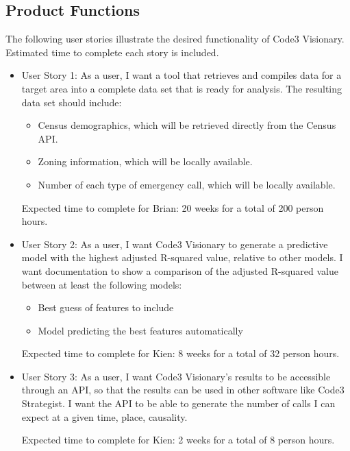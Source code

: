 \documentclass[onecolumn, draftclsnofoot,10pt, compsoc]{IEEEtran}
\begin{document}
    \subsection{Product Functions}
    The following user stories illustrate the desired functionality of Code3 Visionary. Estimated time to complete each story is included.
    \begin{itemize}
        \item{User Story 1:} As a user, I want a tool that retrieves and compiles data for a target area into a complete data set that is ready for analysis. The resulting data set should include:
        \begin{itemize}
            \item Census demographics, which will be retrieved directly from the Census API.
            \item Zoning information, which will be locally available.
            \item Number of each type of emergency call, which will be locally available.
        \end{itemize}
        Expected time to complete for Brian: 20 weeks for a total of 200 person hours.
        \item{User Story 2:} As a user, I want Code3 Visionary to generate a predictive model with the highest adjusted R-squared value, relative to other models. I want documentation to show a comparison of the adjusted R-squared value between at least the following models:
        \begin{itemize}
            \item Best guess of features to include
            \item Model predicting the best features automatically
        \end{itemize}
        Expected time to complete for Kien: 8 weeks for a total of 32 person hours.
        \item{User Story 3:} As a user, I want Code3 Visionary's results to be accessible through an API, so that the results can be used in other software like Code3 Strategist. I want the API to be able to generate the number of calls I can expect at a given time, place, causality. 
        
        Expected time to complete for Kien: 2 weeks for a total of 8 person hours.
    \end{itemize}
    
\end{document}
